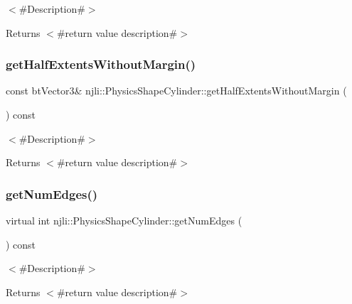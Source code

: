 $<$\#\+Description\#$>$

\begin{DoxyReturn}{Returns}
$<$\#return value description\#$>$ 
\end{DoxyReturn}
\mbox{\label{classnjli_1_1_physics_shape_cylinder_aae8b9aef78ec51c51ed8a3fe875df5b4}} 
\subsubsection{\texorpdfstring{get\+Half\+Extents\+Without\+Margin()}{getHalfExtentsWithoutMargin()}}
{\footnotesize\ttfamily const bt\+Vector3\& njli\+::\+Physics\+Shape\+Cylinder\+::get\+Half\+Extents\+Without\+Margin (\begin{DoxyParamCaption}{ }\end{DoxyParamCaption}) const}

$<$\#\+Description\#$>$

\begin{DoxyReturn}{Returns}
$<$\#return value description\#$>$ 
\end{DoxyReturn}
\mbox{\label{classnjli_1_1_physics_shape_cylinder_a05334d41b8bad6261922842a5c204015}} 
\subsubsection{\texorpdfstring{get\+Num\+Edges()}{getNumEdges()}}
{\footnotesize\ttfamily virtual int njli\+::\+Physics\+Shape\+Cylinder\+::get\+Num\+Edges (\begin{DoxyParamCaption}{ }\end{DoxyParamCaption}) const\hspace{0.3cm}{\ttfamily [virtual]}}

$<$\#\+Description\#$>$

\begin{DoxyReturn}{Returns}
$<$\#return value description\#$>$ 
\end{DoxyReturn}


